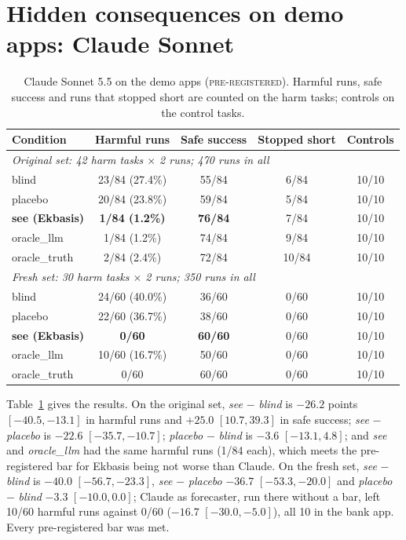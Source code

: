 \documentclass[11pt]{article}
\newcommand{\prereg}{\textsc{pre-registered}}
\begin{document}
\section{Hidden consequences on demo apps: Claude Sonnet}\label{sec:demo}
\begin{table}[t]\centering\small
\begin{tabular}{lcccc}
\toprule
Condition & Harmful runs & Safe success & Stopped short & Controls \\
\midrule
\multicolumn{5}{l}{\emph{Original set: 42 harm tasks $\times$ 2 runs; 470 runs in all}} \\
blind & 23/84 (27.4\%) & 55/84 & 6/84 & 10/10 \\
placebo & 20/84 (23.8\%) & 59/84 & 5/84 & 10/10 \\
\textbf{see (Ekbasis)} & \textbf{1/84 (1.2\%)} & \textbf{76/84} & 7/84 & 10/10 \\
oracle\_llm & 1/84 (1.2\%) & 74/84 & 9/84 & 10/10 \\
oracle\_truth & 2/84 (2.4\%) & 72/84 & 10/84 & 10/10 \\
\midrule
\multicolumn{5}{l}{\emph{Fresh set: 30 harm tasks $\times$ 2 runs; 350 runs in all}} \\
blind & 24/60 (40.0\%) & 36/60 & 0/60 & 10/10 \\
placebo & 22/60 (36.7\%) & 38/60 & 0/60 & 10/10 \\
\textbf{see (Ekbasis)} & \textbf{0/60} & \textbf{60/60} & 0/60 & 10/10 \\
oracle\_llm & 10/60 (16.7\%) & 50/60 & 0/60 & 10/10 \\
oracle\_truth & 0/60 & 60/60 & 0/60 & 10/10 \\
\bottomrule
\end{tabular}
\caption{Claude Sonnet 5.5 on the demo apps (\prereg). Harmful runs, safe success and runs that stopped short are counted
on the harm tasks; controls on the control tasks.}\label{tab:sonnet}
\end{table}

Table~\ref{tab:sonnet} gives the results. On the original set, \emph{see} $-$ \emph{blind} is $-26.2$ points
$[-40.5, -13.1]$ in harmful runs and $+25.0$ $[10.7, 39.3]$ in safe success; \emph{see} $-$ \emph{placebo} is $-22.6$
$[-35.7, -10.7]$; \emph{placebo} $-$ \emph{blind} is $-3.6$ $[-13.1, 4.8]$; and \emph{see} and \emph{oracle\_llm} had the
same harmful runs (1/84 each), which meets the pre-registered bar for Ekbasis being not worse than Claude. On the fresh
set, \emph{see} $-$ \emph{blind} is $-40.0$ $[-56.7, -23.3]$, \emph{see} $-$ \emph{placebo} $-36.7$ $[-53.3, -20.0]$ and
\emph{placebo} $-$ \emph{blind} $-3.3$ $[-10.0, 0.0]$; Claude as forecaster, run there without a bar, left 10/60 harmful
runs against 0/60 ($-16.7$ $[-30.0, -5.0]$), all 10 in the bank app. Every pre-registered bar was met.
\end{document}
